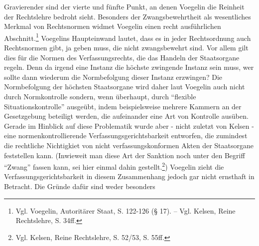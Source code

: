 \documentclass[12pt,a4paper,ngerman]{article}
\begin{document}
Gravierender sind der vierte und fünfte Punkt, an denen Voegelin die Reinheit
der Rechtslehre bedroht sieht. Besonders der Zwangsbewehrtheit als
wesentliches Merkmal von Rechtsnormen widmet Voegelin einen recht ausführlichen
Abschnitt.\footnote{Vgl. Voegelin, Autoritärer Staat, S.  122-126 (§ 17). --
  Vgl. Kelsen, Reine Rechtslehre, S. 34ff.}  Voegelins Haupteinwand lautet,
dass es in jeder Rechtsordnung auch Rechtsnormen gibt, ja geben muss, die
nicht zwangsbewehrt sind. Vor allem gilt dies für die Normen des
Verfassungsrechts, die das Handeln der Staatsorgane regeln. Denn da irgend
eine Instanz die höchste zwingende Instanz sein muss, wer sollte dann wiederum
die Normbefolgung dieser Instanz erzwingen? Die Normbefolgung der höchsten
Staatsorgane wird daher laut Voegelin auch nicht durch Normkontrolle sondern,
wenn überhaupt, durch "`flexible Situationskontrolle"' ausgeübt, indem
beispielsweise mehrere Kammern an der Gesetzgebung beteiligt werden, die
aufeinander eine Art von Kontrolle ausüben.  
Gerade im Hinblick auf diese Problematik wurde aber - nicht zuletzt von Kelsen -
eine normenkontrollierende Verfassungsgerichtsbarkeit entworfen, die zumindest
die rechtliche Nichtigkiet von nicht verfassungskonformen Akten der
Staatsorgane feststellen kann. (Inwieweit man diese Art der Sanktion noch
unter den Begriff "`Zwang"' fassen kann, sei hier einmal dahin
gestellt.\footnote{Vgl. Kelsen, Reine Rechtslehre, S. 52/53, S. 55ff.})
Voegelin zieht die Verfassungsgerichtsbarkeit in diesem Zusammenhang jedoch
gar nicht ernsthaft in Betracht. Die Gründe dafür sind weder besonders
\end{document}
